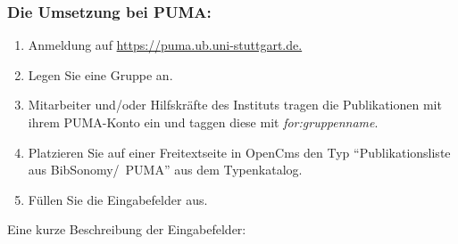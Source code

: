 \subsubsection*{Die Umsetzung bei PUMA:}\label{sss:iplPuma}
\begin{enumerate}
\item  Anmeldung auf \url{https://puma.ub.uni-stuttgart.de.}
\item Legen Sie eine Gruppe an.
\item Mitarbeiter und/oder Hilfskräfte des Instituts tragen die Publikationen mit ihrem PUMA-Konto ein und taggen diese mit \textit{for:gruppenname}.
\item Platzieren Sie auf einer Freitextseite in OpenCms den Typ \enquote{Publikationsliste aus BibSonomy/~PUMA} aus dem Typenkatalog.
\item Füllen Sie die Eingabefelder aus.
\end{enumerate}
Eine kurze Beschreibung der Eingabefelder:\newline
